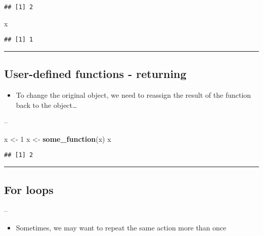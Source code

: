 \documentclass[]{article}
\newenvironment{Shaded}{\begin{snugshade}}{\end{snugshade}}
\newcommand{\DecValTok}[1]{\textcolor[rgb]{0.00,0.00,0.81}{#1}}
\newcommand{\KeywordTok}[1]{\textcolor[rgb]{0.13,0.29,0.53}{\textbf{#1}}}
\newcommand{\NormalTok}[1]{#1}
\newcommand{\StringTok}[1]{\textcolor[rgb]{0.31,0.60,0.02}{#1}}
\providecommand{\tightlist}{%
  \setlength{\itemsep}{0pt}\setlength{\parskip}{0pt}}
\begin{document}
\begin{verbatim}
## [1] 2
\end{verbatim}

\begin{Shaded}
\begin{Highlighting}[]
\NormalTok{x}
\end{Highlighting}
\end{Shaded}

\begin{verbatim}
## [1] 1
\end{verbatim}

\begin{center}\rule{0.5\linewidth}{\linethickness}\end{center}

\hypertarget{user-defined-functions---returning-1}{%
\subsection{User-defined functions -
returning}\label{user-defined-functions---returning-1}}

\begin{itemize}
\tightlist
\item
  To change the original object, we need to reassign the result of the
  function back to the object\ldots{}
\end{itemize}

--

\begin{Shaded}
\begin{Highlighting}[]
\NormalTok{x <-}\StringTok{ }\DecValTok{1}
\NormalTok{x <-}\StringTok{ }\KeywordTok{some_function}\NormalTok{(x)}
\NormalTok{x}
\end{Highlighting}
\end{Shaded}

\begin{verbatim}
## [1] 2
\end{verbatim}

\begin{center}\rule{0.5\linewidth}{\linethickness}\end{center}

\hypertarget{for-loops}{%
\subsection{For loops}\label{for-loops}}

--

\begin{itemize}
\tightlist
\item
  Sometimes, we may want to repeat the same action more than once
\end{itemize}
\end{document}

